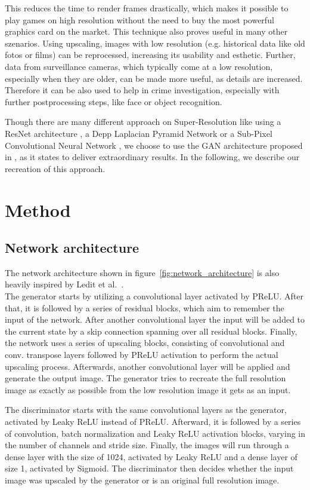 \documentclass[11pt,twocolumn,twoside,paper=a4]{IEEEtran}
\begin{document}
This reduces the time to render frames drastically, which makes it possible to play games on high resolution without the need to buy the most powerful graphics card on the market. 
This technique also proves useful in many other szenarios.
Using upscaling, images with low resolution (e.g. historical data like old fotos or films) can be reprocessed, increasing its usability and esthetic.
Further, data from surveillance cameras, which typically come at a low resolution, especially when they are older, can be made more useful, as details are increased. Therefore it can be also used to help in crime investigation, especially with further postprocessing steps, like face or object recognition.

Though there are many different approach on Super-Resolution like using a ResNet architecture \cite{lim2017enhanced}, a Depp Laplacian Pyramid Network \cite{lai2018fast} or a Sub-Pixel Convolutional Neural Network \cite{shi2016real}, we choose to use the GAN architecture proposed in \cite{DBLP:journals/corr/LedigTHCATTWS16}, as it states to deliver extraordinary results.
In the following, we describe our recreation of this approach.

\section{Method}
\subsection{Network architecture}
The network architecture shown in figure~\ref{fig:network_architecture} is also heavily inspired by Ledit et al.~\cite{DBLP:journals/corr/LedigTHCATTWS16}.\\
The generator starts by utilizing a convolutional layer activated by PReLU. 
After that, it is followed by a series of residual blocks, 
which aim to remember the input of the network. 
After another convolutional layer the input will be added to the current state by a skip connection spanning over all residual blocks. 
Finally, the network uses a series of upscaling blocks, consisting of convolutional and conv. transpose layers followed by PReLU activation to perform the actual upscaling process. 
Afterwards, another convolutional layer will be applied and generate the output image. The generator tries to recreate the full resolution image as exactly as possible from the low resolution image it gets as an input.

The discriminator starts with the same convolutional layers as the generator, activated by Leaky ReLU instead of PReLU. 
Afterward, it is followed by a series of convolution, batch normalization and Leaky ReLU activation blocks, varying in the number of channels and stride size. 
Finally, the images will run through a dense layer with the size of 1024, activated by Leaky ReLU and a dense layer of size 1, activated by Sigmoid. 
The discriminator then decides whether the input image was upscaled by the generator or is an original full resolution image.
\end{document}
